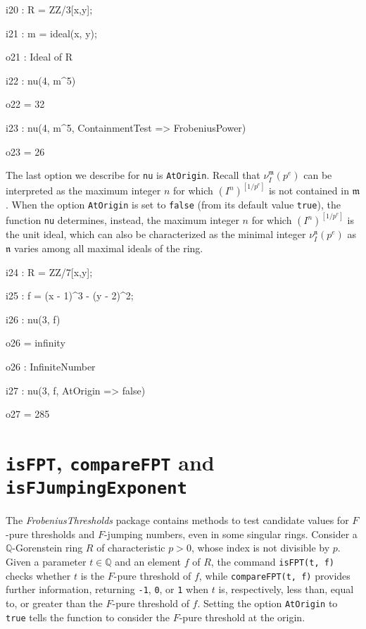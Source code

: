 \documentclass{amsart}
\newcommand{\idealm}{\mathfrak{m}}
\begin{document}
\smallskip
{\small
{}
\begin{MyVerbatim}
i20 : R = ZZ/3[x,y];

i21 : m = ideal(x, y);

o21 : Ideal of R

i22 : nu(4, m^5)

o22 = 32

i23 : nu(4, m^5, ContainmentTest => FrobeniusPower)

o23 = 26
\end{MyVerbatim}
}
\smallskip

The last option we describe for \texttt{nu} is \texttt{AtOrigin}.
Recall that $\nu_I^\idealm(p^e)$ can be interpreted as the maximum integer $n$ for which $(I^n)^{[1/p^e]}$ is not contained in $\idealm$. 
When the option \texttt{AtOrigin} is set to \texttt{false} (from its default value \texttt{true}), the function \texttt{nu} determines, instead, the maximum integer $n$ for which $(I^n)^{[1/p^e]}$ is the unit ideal, which can also be characterized as the minimal integer $\nu_I^\mathfrak{n}(p^e)$ as $\mathfrak{n}$ varies among all maximal ideals of the ring.  

\smallskip
{\small
{}
\begin{MyVerbatim}
i24 : R = ZZ/7[x,y];

i25 : f = (x - 1)^3 - (y - 2)^2;

i26 : nu(3, f)

o26 = infinity

o26 : InfiniteNumber

i27 : nu(3, f, AtOrigin => false)

o27 = 285
\end{MyVerbatim}
}

\section{{\tt isFPT}, {\tt compareFPT} and {\tt isFJumpingExponent}}
\label{sec.IsFPT}

The \emph{FrobeniusThresholds} package contains methods to test candidate values for $F$-pure thresholds and $F$-jumping numbers, even in some singular rings.
Consider a  $\mathbb{Q}$-Gorenstein ring $R$ of characteristic $p>0$, whose index is not divisible by $p$.
Given a parameter $t\in \mathbb{Q}$ and an element $f$ of $R$, the command \texttt{isFPT(t, f)} checks whether $t$ is the $F$-pure threshold of $f$, while \texttt{compareFPT(t, f)} provides further information, returning {\tt-1}, \texttt{0}, or \texttt{1} when $t$ is, respectively, less than, equal to, or greater than the $F$-pure threshold of $f$.  Setting the option \texttt{AtOrigin} to \texttt{true} tells the function to consider the $F$-pure threshold at the origin.  %
\end{document}
